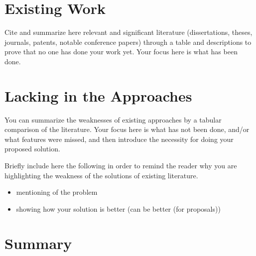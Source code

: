 \section{Existing Work}

Cite and summarize here relevant and significant literature (dissertations, theses, journals, patents, notable conference papers) through a table and descriptions to prove that no one has done your work yet. Your focus here is what has been done.

\textcolor[rgb]{0.75,0.75,0.75}{\Blindtext}

\section{Lacking in the Approaches}

You can summarize the weaknesses of existing approaches by a tabular comparison of the literature. Your focus here is what has not been done, and/or what features were missed, and then introduce the necessity for doing your proposed solution.

Briefly include here the following in order to remind the reader why you are highlighting the weakness of the solutions of existing literature. 

\begin{itemize}
	\item mentioning of the problem
	\item showing how your solution is better (can be better (for proposals))
\end{itemize}


\textcolor[rgb]{0.75,0.75,0.75}{\Blindtext}

\section{Summary}




